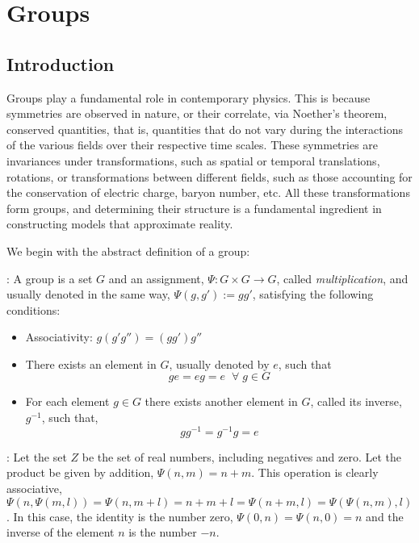 

\chapter{Groups}

\section{Introduction}

Groups play a fundamental role in contemporary physics. This is because symmetries are observed in nature, or their correlate, via Noether's theorem, conserved quantities, that is, quantities that do not vary during the interactions of the various fields over their respective time scales. These symmetries are invariances under transformations, such as spatial or temporal translations, rotations, or transformations between different fields, such as those accounting for the conservation of electric charge, baryon number, etc. All these transformations form groups, and determining their structure is a fundamental ingredient in constructing models that approximate reality.

We begin with the abstract definition of a group:

: A group is a set $G$ and an assignment, $\Psi: G \times G \to G$, called {\sl multiplication}, and usually denoted in the same way, $\Psi(g,g') :=  g g'$,
satisfying the following conditions:

\begin{itemize}

\item Associativity: $g(g'g'') = (gg')g''$

\item There exists an element in $G$, usually denoted by $e$, such that 
\[
 ge = eg = e \;\;\forall \; g \in G 
\]

\item For each element $g \in G$ there exists another element in $G$, called its inverse, $g^{-1}$,
such that, 
\[
g g^{-1} = g^{-1} g = e
\]

\end{itemize}

\ejem: 
Let the set $Z$ be the set of real numbers, including negatives and zero. Let the product be given by addition,
$\Psi(n,m)=n+m$. This operation is clearly associative, 
$\Psi(n,\Psi(m,l)) = \Psi(n, m+l) =  n+ m + l = \Psi(n+m,l)=\Psi(\Psi(n,m),l)$. In this case, the identity is the number zero, $\Psi(0,n)=\Psi(n,0)=n$ and the inverse of the element $n$ is the number $-n$.

